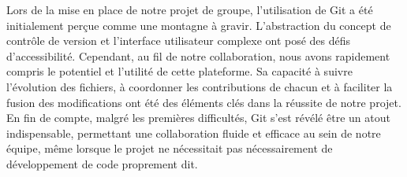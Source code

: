 \documentclass[12pt,a4paper,oneside,titlepage]{article} %
\begin{document}
Lors de la mise en place de notre projet de groupe, l'utilisation de Git a été initialement perçue comme une montagne à gravir. L'abstraction du concept de contrôle de version et l'interface utilisateur complexe ont posé des défis d'accessibilité. Cependant, au fil de notre collaboration, nous avons rapidement compris le potentiel et l'utilité de cette plateforme. 
Sa capacité à suivre l'évolution des fichiers, à coordonner les contributions de chacun et à faciliter la fusion des modifications ont été des éléments clés dans la réussite de notre projet. En fin de compte, malgré les premières difficultés, Git s'est révélé être un atout indispensable, permettant une collaboration fluide et efficace au sein de notre équipe, même lorsque le projet ne nécessitait pas nécessairement de développement de code proprement dit.
\end{document}
